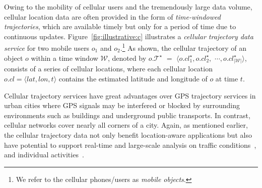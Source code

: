 \documentclass{vldb}
\begin{document}
	
	Owing to the mobility of cellular users and the tremendously large data volume, cellular location data are often provided in the form of {\em time-windowed trajectories}, which are available timely but only for a period of time due to continuous updates. Figure~\ref{fig:illustrative:c} illustrates a {\em cellular trajectory data service} for two mobile users $o_1$ and $o_2$.\footnote{We refer to the cellular phones/users as {\em mobile objects}.} As shown, the cellular trajectory of an object $o$ within a time window $\mathcal{W}$, denoted by $o.\mathcal{T}^\star$ $=$ $\langle o.cl_1^\star, o.cl_2^\star,$ $\cdots, o.cl_{|\mathcal{W}|}^\star\rangle$, consists of a series of cellular locations, where each cellular location $o.cl=\langle lat,lon,t \rangle$ contains the estimated latitude and longitude of $o$ at time $t$.  
	
	Cellular trajectory services have great advantages over GPS trajectory services in urban cities where GPS signals may be interfered or blocked by surrounding environments such as buildings and underground public transports.
	In contrast, cellular networks cover nearly all corners of a city. Again, as mentioned earlier, the cellular trajectory data not only benefit location-aware applications but also have potential to support real-time and large-scale analysis on traffic conditions~\cite{calabrese2011estimating,blondel2012data,steenbruggen2015data}, and individual activities~\cite{phithakkitnukoon2010activity,calabrese2013understanding}. 
	
	
\end{document}
